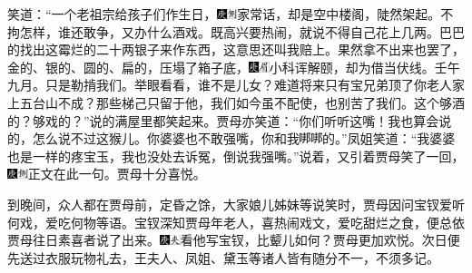 笑道：“一个老祖宗给孩子们作生日，{\includegraphics[width=3mm]{../Images/00004}\includegraphics[width=3mm]{../Images/00011}\footnotesize \kaishu 家常话，却是空中楼阁，陡然架起。}不拘怎样，谁还敢争，又办什么酒戏。既高兴要热闹，就说不得自己花上几两。巴巴的找出这霉烂的二十两银子来作东西，这意思还叫我赔上。果然拿不出来也罢了，金的、银的、圆的、扁的，压塌了箱子底，{\includegraphics[width=3mm]{../Images/00004}\includegraphics[width=3mm]{../Images/00010}\footnotesize \kaishu 小科诨解颐，却为借当伏线。壬午九月。}只是勒掯我们。举眼看看，谁不是儿女？难道将来只有宝兄弟顶了你老人家上五台山不成？那些梯己只留于他，我们如今虽不配使，也别苦了我们。这个够酒的？够戏的？”说的满屋里都笑起来。贾母亦笑道：“你们听听这嘴！我也算会说的，怎么说不过这猴儿。你婆婆也不敢强嘴，你和我\includegraphics[width=9.4pt,height=9.4pt,align=c,vshift=1pt]{../images/00035}\includegraphics[width=9.4pt,height=9.4pt,align=c,vshift=1pt]{../images/00035}的。”凤姐笑道：“我婆婆也是一样的疼宝玉，我也没处去诉冤，倒说我强嘴。”说着，又引着贾母笑了一回，{\includegraphics[width=3mm]{../Images/00004}\includegraphics[width=3mm]{../Images/00011}\footnotesize \kaishu 正文在此一句。}贾母十分喜悦。

到晚间，众人都在贾母前，定昏之馀，大家娘儿姊妹等说笑时，贾母因问宝钗爱听何戏，爱吃何物等语。宝钗深知贾母年老人，喜热闹戏文，爱吃甜烂之食，便总依贾母往日素喜者说了出来。{\includegraphics[width=3mm]{../Images/00004}\includegraphics[width=3mm]{../Images/00012}\footnotesize \kaishu 看他写宝钗，比颦儿如何？}贾母更加欢悦。次日便先送过衣服玩物礼去，王夫人、凤姐、黛玉等诸人皆有随分不一，不须多记。

